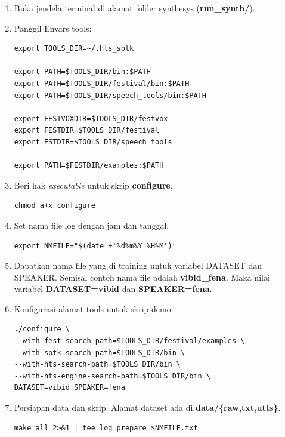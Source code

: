 \documentclass[12pt,]{article}
\begin{document}
	\begin{enumerate}
		\item Buka jendela terminal di alamat folder synthesys (\textbf{run\_synth/}).
		
		\item Panggil Envars tools:
		\begin{verbatim}
export TOOLS_DIR=~/.hts_sptk

export PATH=$TOOLS_DIR/bin:$PATH
export PATH=$TOOLS_DIR/festival/bin:$PATH
export PATH=$TOOLS_DIR/speech_tools/bin:$PATH

export FESTVOXDIR=$TOOLS_DIR/festvox
export FESTDIR=$TOOLS_DIR/festival
export ESTDIR=$TOOLS_DIR/speech_tools

export PATH=$FESTDIR/examples:$PATH
		\end{verbatim}

		\item Beri hak \textit{executable} untuk skrip \textbf{configure}.
		\begin{verbatim}
chmod a+x configure
		\end{verbatim}
		
		\item Set nama file log dengan jam dan tanggal.
		\begin{verbatim}
export NMFILE="$(date +'%d%m%Y_%H%M')"
		\end{verbatim}
		
		\item Dapatkan nama file yang di training untuk variabel DATASET dan SPEAKER.
		Semisal contoh nama file adalah \textbf{vibid\_fena}.
		Maka nilai variabel \textbf{DATASET=vibid} dan \textbf{SPEAKER=fena}.
		
		\item Konfigurasi alamat tools untuk skrip demo:
		\begin{verbatim}
./configure \
--with-fest-search-path=$TOOLS_DIR/festival/examples \
--with-sptk-search-path=$TOOLS_DIR/bin \
--with-hts-search-path=$TOOLS_DIR/bin \
--with-hts-engine-search-path=$TOOLS_DIR/bin \
DATASET=vibid SPEAKER=fena
		\end{verbatim}
		
		\item Persiapan data dan skrip.
		Alamat dataset ada di \textbf{data/\{raw,txt,utts\}}.
		\begin{verbatim}
make all 2>&1 | tee log_prepare_$NMFILE.txt
		\end{verbatim}
		

\end{enumerate}
\end{document}
